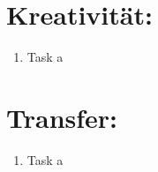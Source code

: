     \section*{Kreativität:}
    \begin{enumerate}[label=(\alph*)]
    	\item Task a
    \end{enumerate}
    \section*{Transfer:}
    \begin{enumerate}[label=(\alph*)]
    	\item Task a
    \end{enumerate}







